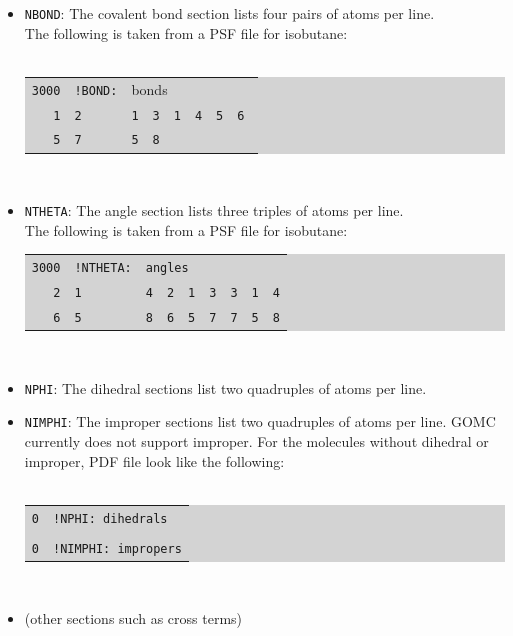 \begin{itemize}
\item \texttt{NBOND}: The covalent bond section lists four pairs of atoms per line. \\
The following is taken from a PSF file for isobutane: \\\\
\colorbox{lightgray}{
\begin{tabular}{r l l l l l l l l}
\texttt{3000} & \texttt{!BOND:} & \multicolumn{7}{l}{bonds}\\
\texttt{1} & \texttt{2} & \texttt{1} & \texttt{3} & \texttt{1} & \texttt{4} & \texttt{5} & \multicolumn{2}{l}{\texttt{6}}\\ 
\texttt{5} & \texttt{7} & \texttt{5} & \multicolumn{2}{l}{\texttt{8}}\\ 
\end{tabular}
}\\

\item \texttt{NTHETA}: The angle section lists three triples of atoms per line. \\
The following is taken from a PSF file for isobutane: \\

\colorbox{lightgray}{
\begin{tabular}{r l l l l l l l l}
\texttt{3000} & \texttt{!NTHETA:} & \multicolumn{7}{l}{\texttt{angles}}\\
\texttt{2} & \texttt{1} & \texttt{4} & \texttt{2} & \texttt{1} & \texttt{3} & \texttt{3} & \texttt{1} & \texttt{4}\\
\texttt{6} & \texttt{5} & \texttt{8} & \texttt{6} & \texttt{5} & \texttt{7} & \texttt{7} & \texttt{5} & \texttt{8}\\
\end{tabular}
}\\

\item \texttt{NPHI}: The dihedral sections list two quadruples of atoms per line. 

\item \texttt{NIMPHI}: The improper sections list two quadruples of atoms per line. GOMC currently does not support improper. For the molecules without dihedral or improper, PDF file look like the following:\\\\
\colorbox{lightgray}{
\begin{tabular}{r l l l l l l l l}
\texttt{0} & \multicolumn{8}{l}{\texttt{!NPHI: dihedrals}}\\
&  & &  &  & &  & & \\
\texttt{0} & \multicolumn{8}{l}{\texttt{!NIMPHI: impropers}}\\
\end{tabular}
}\\

\item (other sections such as cross terms) \\
\end{itemize}

